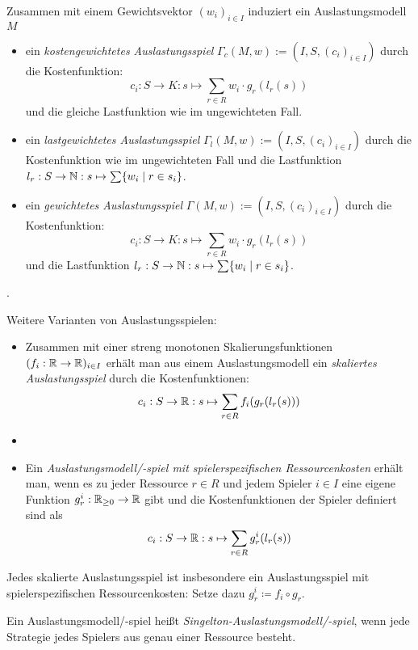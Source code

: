 \begin{defn}\label{def:gewAuslastungsspiel}
	Zusammen mit einem Gewichtsvektor $(w_i)_{i\in I}$ induziert ein Auslastungsmodell $M$ 
	\begin{itemize}
		\item ein \emph{kostengewichtetes Auslastungsspiel} $\Gamma_c(M, w) := (I, S, (c_i)_{i \in I})$ durch die Kostenfunktion:
		\[c_i: S \to K: s \mapsto \sum_{r \in R} w_i\cdot g_r(l_r(s)) \]
		und die gleiche Lastfunktion wie im ungewichteten Fall.
		\item ein \emph{lastgewichtetes Auslastungsspiel} $\Gamma_l(M, w) := (I, S, (c_i)_{i \in I})$ durch die Kostenfunktion wie im ungewichteten Fall und die Lastfunktion $l_r: S \to \mathbb{N}: s \mapsto \sum\{w_i \mid r \in s_i\}$.
		\item ein \emph{gewichtetes Auslastungsspiel} $\Gamma(M, w) := (I, S, (c_i)_{i \in I})$ durch die Kostenfunktion:
		\[c_i: S \to K: s \mapsto \sum_{r \in R} w_i\cdot g_r(l_r(s)) \]
		und die Lastfunktion $l_r: S \to \mathbb{N}: s \mapsto \sum\{w_i \mid r \in s_i\}$.
	\end{itemize}	
\end{defn}

\begin{bsp}.
	
\end{bsp}

Weitere Varianten von Auslastungsspielen:

\begin{defn}\label{def:weitereAuslastungsspiel}
	\begin{itemize}
		\item Zusammen mit einer streng monotonen Skalierungsfunktionen $(f_i: \mathbb{R} \to \mathbb{R})_{i\in I}$ erhält man aus einem Auslastungsmodell ein \emph{skaliertes Auslastungsspiel} durch die Kostenfunktionen:
			\[c_i: S \to \mathbb{R}: s \mapsto \sum_{r \in R} f_i(g_r(l_r(s))) \]
		\item {}
		\item Ein \emph{Auslastungsmodell/-spiel mit spielerspezifischen Ressourcenkosten} erhält man, wenn es zu jeder Ressource $r \in R$ und jedem Spieler $i \in I$ eine eigene Funktion $g_r^i: \mathbb{R}_{\geq 0} \to \mathbb{R}$ gibt und die Kostenfunktionen der Spieler definiert sind als
			\[c_i: S \to \mathbb{R}: s \mapsto \sum_{r \in R} g_r^i(l_r(s)) \]
	\end{itemize}
\end{defn}

\begin{bem}
	Jedes skalierte Auslastungsspiel ist insbesondere ein Auslastungsspiel mit spielerspezifischen Ressourcenkosten: Setze dazu $g_r^i \coloneqq f_i \circ g_r$.
\end{bem}

\begin{defn}
	Ein Auslastungsmodell/-spiel heißt \emph{Singelton-Auslastungsmodell/-spiel}, wenn jede Strategie jedes Spielers aus genau einer Ressource besteht.
\end{defn}